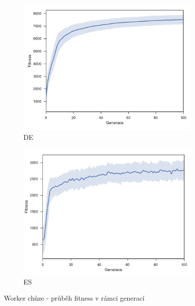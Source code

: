 	\begin{figure}[p]
		\centering
		\begin{subfigure}{.5\textwidth}
			\centering
			\includegraphics[width=\linewidth]{../img/WoodMap/DE/WorkerWalkMem}
			\caption{DE}
			\label{obr04:WWalkDE}
		\end{subfigure}%
		\begin{subfigure}{.5\textwidth}
			\centering
			\includegraphics[width=\linewidth]{../img/WoodMap/ES/WoodWWalkES}
			\caption{ES}
			\label{obr04:WWalkES}
		\end{subfigure}
		\caption{Worker chůze - průběh fitness v rámci generací}
		\label{obr04:WWalk}
	\end{figure}
	\clearpage 
	
